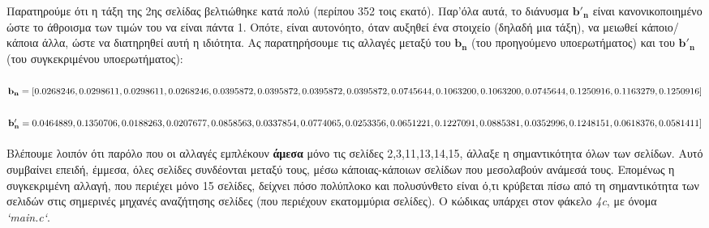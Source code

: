 \documentclass[a4paper, 14pt]{article}   %
\begin{document}
Παρατηρούμε ότι η τάξη της 2ης σελίδας βελτιώθηκε κατά πολύ (περίπου 352 τοις εκατό). Παρ'όλα αυτά, το διάνυσμα $\mathbf{b'_n}$ είναι κανονικοποιημένο ώστε το άθροισμα των τιμών του να είναι πάντα 1. Οπότε, είναι αυτονόητο, όταν αυξηθεί ένα στοιχείο (δηλαδή μια τάξη), να μειωθεί κάποιο/κάποια άλλα, ώστε να διατηρηθεί αυτή η ιδιότητα. Ας παρατηρήσουμε τις αλλαγές μεταξύ του $\mathbf{b_n}$ (του προηγούμενο υποερωτήματος) και του $\mathbf{b'_n}$ (του συγκεκριμένου υποερωτήματος):\\\\
$\mathbf{b_n} = [0.0268246, 0.0298611, 0.0298611, 0.0268246, 0.0395872, 0.0395872, 0.0395872,\\ 0.0395872, 0.0745644, 0.1063200, 0.1063200, 0.0745644, 0.1250916, 0.1163279,  0.1250916]$\\\\
$\mathbf{b'_n} = 0.0464889, 0.1350706, 0.0188263, 0.0207677, 0.0858563, 0.0337854, 0.0774065,\\ 0.0253356, 0.0651221, 0.1227091, 0.0885381, 0.0352996, 0.1248151, 0.0618376, 0.0581411]$\\\\
Βλέπουμε λοιπόν ότι παρόλο που οι αλλαγές εμπλέκουν \textbf{άμεσα} μόνο τις σελίδες 2,3,11,13,14,15, άλλαξε η σημαντικότητα όλων των σελίδων. Αυτό συμβαίνει επειδή, έμμεσα, όλες σελίδες συνδέονται μεταξύ τους, μέσω κάποιας-κάποιων σελίδων που μεσολαβούν ανάμεσά τους. Επομένως η συγκεκριμένη αλλαγή, που περιέχει μόνο 15 σελίδες, δείχνει πόσο πολύπλοκο και πολυσύνθετο είναι ό,τι κρύβεται πίσω από τη σημαντικότητα των σελιδών στις σημερινές μηχανές αναζήτησης σελίδες (που περιέχουν εκατομμύρια σελίδες). Ο κώδικας υπάρχει στον φάκελο \emph{4c}, με όνομα \emph{`main.c`}.
\\\\
\end{document}
